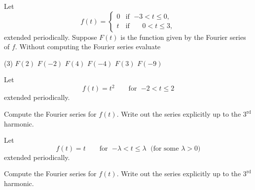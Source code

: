 \begin{exercise}
Let
\begin{equation*}
f(t) =
\begin{cases}
0 & \text{if } \; {-3} < t \leq 0, \\
t & \text{if } \; \phantom{-}0 < t \leq 3,
\end{cases}
\end{equation*}
extended periodically.  Suppose $F(t)$ is the function given
by the Fourier series of $f$.  Without computing the Fourier series
evaluate
\begin{tasks}(3)
\task $F(2)$
\task $F(-2)$
\task $F(4)$
\task $F(-4)$
\task $F(3)$
\task $F(-9)$
\end{tasks}
\end{exercise}

\setcounter{exercise}{100}

\begin{exercise}
Let
\begin{equation*}
f(t) = t^2 \qquad \text{for } \; {-2} < t \leq 2
\end{equation*}
extended periodically.
\begin{tasks}
\task Compute the Fourier series for $f(t)$.
\task Write out the series explicitly up to the $3^{\text{rd}}$ harmonic.
\end{tasks}
\end{exercise}

\begin{exercise}
Let
\begin{equation*}
f(t) = t \qquad \text{for } \; {-\lambda} < t \leq \lambda \; \text{ (for some } \lambda > 0 \text{)}
\end{equation*}
extended periodically.
\begin{tasks}
\task Compute the Fourier series for $f(t)$.
\task Write out the series explicitly up to the $3^{\text{rd}}$ harmonic.
\end{tasks}
\end{exercise}

